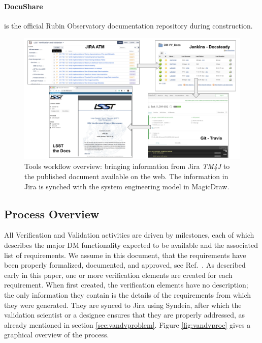 \paragraph{DocuShare}
is the official Rubin Observatory documentation repository during construction.

\begin{figure}
\begin{center}
\includegraphics[width=\textwidth]{imgs/screenshots.png}
 \caption{Tools workflow overview: bringing information from Jira \textit{TM4J} to the published document available on the web. The information in Jira is synched with the system engineering model in MagicDraw.}
 \label{fig:overview}
\end{center}
\end{figure}


\subsection{Process Overview}\label{sec:proc}

All Verification and Validation activities are driven by milestones, each of which describes the major DM functionality expected to be available and the associated list of requirements. 
We assume in this document, that the requirements have been properly formalized, documented, and approved, 
see Ref.~.
As described early in this paper, one or more verification elements are created for each requirement.
When first created, the verification elements have no description; the only information they contain is the details of the requirements from which they were generated.
They are synced to Jira using Syndeia, after which the validation scientist or a designee ensures that they are properly addressed, as already mentioned in section \ref{sec:vandvproblem}.
Figure  \ref{fig:vandvproc} gives a graphical overview of the process.

